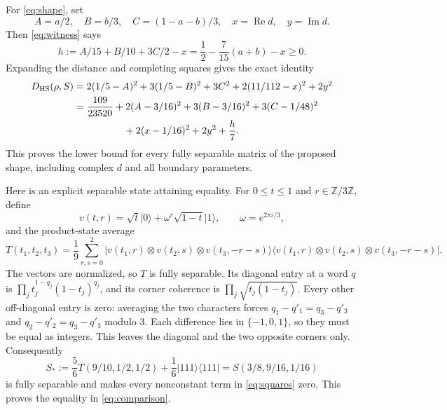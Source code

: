 \documentclass[11pt]{article}
\newcommand{\ket}[1]{\lvert #1\rangle}
\newcommand{\bra}[1]{\langle #1\rvert}
\newcommand{\proj}[1]{\ket{#1}\!\bra{#1}}
\newcommand{\Rea}{\operatorname{Re}}
\newcommand{\Ima}{\operatorname{Im}}
\newcommand{\D}{D_{\mathrm{HS}}}
\begin{document}
For \eqref{eq:shape}, set
\[
 A=a/2,\quad B=b/3,\quad C=(1-a-b)/3,\quad x=\Rea d,\quad y=\Ima d.
\]
Then \eqref{eq:witness} says
\begin{equation}\label{eq:halfspace}
 h:=A/15+B/10+3C/2-x=\frac12-\frac7{15}(a+b)-x\ge0.
\end{equation}
Expanding the distance and completing squares gives the exact identity
\begin{align}\label{eq:squares}
 \D(\rho,S)
 &=2(1/5-A)^2+3(1/5-B)^2+3C^2+2(11/112-x)^2+2y^2\notag\\
 &=\frac{109}{23520}+2(A-3/16)^2+3(B-3/16)^2
       +3(C-1/48)^2\notag\\
 &\hspace{18mm}+2(x-1/16)^2+2y^2+\frac h7.
\end{align}
This proves the lower bound for every fully separable matrix of the
proposed shape, including complex $d$ and all boundary parameters.

Here is an explicit separable state attaining equality.
For $0\le t\le1$ and $r\in\mathbb Z/3\mathbb Z$, define
\[
 v(t,r)=\sqrt t\ket0+\omega^r\sqrt{1-t}\ket1,
 \qquad\omega=e^{2\pi i/3},
\]
and the product-state average
\begin{equation}\label{eq:twirl}
 T(t_1,t_2,t_3)=\frac19\sum_{r,s=0}^2
  \proj{v(t_1,r)\otimes v(t_2,s)\otimes v(t_3,-r-s)}.
\end{equation}
The vectors are normalized, so $T$ is fully separable. Its diagonal entry
at a word $q$ is $\prod_j t_j^{1-q_j}(1-t_j)^{q_j}$, and its corner
coherence is $\prod_j\sqrt{t_j(1-t_j)}$.
Every other off-diagonal entry is zero: averaging the two characters forces
$q_1-q'_1=q_3-q'_3$ and $q_2-q'_2=q_3-q'_3$ modulo $3$.
Each difference lies in $\{-1,0,1\}$, so they must be equal as integers.
This leaves the diagonal and the two opposite corners only.
Consequently
\begin{equation}\label{eq:sstar}
 S_*:=\frac56T(9/10,1/2,1/2)+\frac16\proj{111}
     =S(3/8,9/16,1/16)
\end{equation}
is fully separable and makes every nonconstant term in
\eqref{eq:squares} zero. This proves the equality in \eqref{eq:comparison}.
\end{document}
